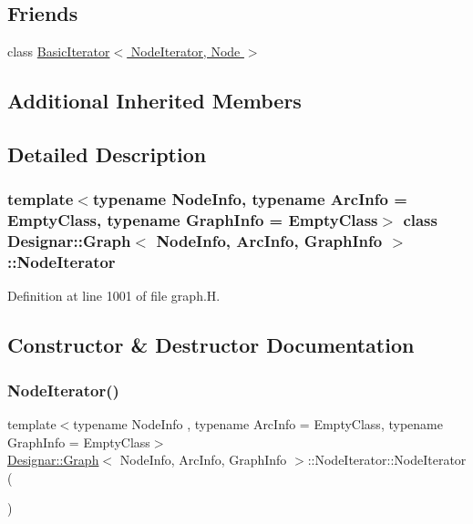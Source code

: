 \subsection*{Friends}
\begin{DoxyCompactItemize}
\item 
class \hyperlink{class_designar_1_1_graph_1_1_node_iterator_a21dc6ae614d097ff896e9e8e422d8f3c}{Basic\+Iterator$<$ Node\+Iterator, Node $>$}
\end{DoxyCompactItemize}
\subsection*{Additional Inherited Members}


\subsection{Detailed Description}
\subsubsection*{template$<$typename Node\+Info, typename Arc\+Info = Empty\+Class, typename Graph\+Info = Empty\+Class$>$\newline
class Designar\+::\+Graph$<$ Node\+Info, Arc\+Info, Graph\+Info $>$\+::\+Node\+Iterator}



Definition at line 1001 of file graph.\+H.



\subsection{Constructor \& Destructor Documentation}
\mbox{\label{class_designar_1_1_graph_1_1_node_iterator_a0449a6ba6cd5d43c04567210a8a064b1}} 
\subsubsection{\texorpdfstring{Node\+Iterator()}{NodeIterator()}\hspace{0.1cm}{\footnotesize\ttfamily [1/5]}}
{\footnotesize\ttfamily template$<$typename Node\+Info , typename Arc\+Info  = Empty\+Class, typename Graph\+Info  = Empty\+Class$>$ \\
\hyperlink{class_designar_1_1_graph}{Designar\+::\+Graph}$<$ Node\+Info, Arc\+Info, Graph\+Info $>$\+::Node\+Iterator\+::\+Node\+Iterator (\begin{DoxyParamCaption}{ }\end{DoxyParamCaption})\hspace{0.3cm}{\ttfamily [inline]}}



